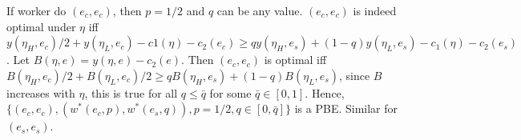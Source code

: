 \documentclass[a4paper,11pt,landscape]{article}
\begin{document}
\begin{multicols*}{3}
If worker do $(e_c,e_c)$, then $p=1/2$ and $q$ can be any value. $(e_c,e_c)$ is indeed optimal under $\eta$ iff $y(\eta_H,e_c)/2+y(\eta_L,e_c)-c1(\eta)-c_2(e_c)\allowbreak\geq qy(\eta_H,e_s)+(1-q)y(\eta_L,e_s)-c_1(\eta)-c_2(e_s)$. Let $B(\eta,e)=y(\eta,e)-c_2(e)$. Then $(e_c,e_c)$ is optimal iff $B(\eta_H,e_c)/2+B(\eta_L,e_c)/2\geq qB(\eta_H,e_s)+(1-q)B(\eta_L,e_s)$, since $B$ increases with $\eta$, this is true for all $q\leq\bar q$ for some $\bar q\in[0,1]$. Hence, $\{(e_c,e_c),(w^*(e_c,p),w^*(e_s,q)),p=1/2,q\in[0,\bar q]\}$ is a PBE. Similar for $(e_s,e_s)$.


\end{multicols*}
\end{document}
